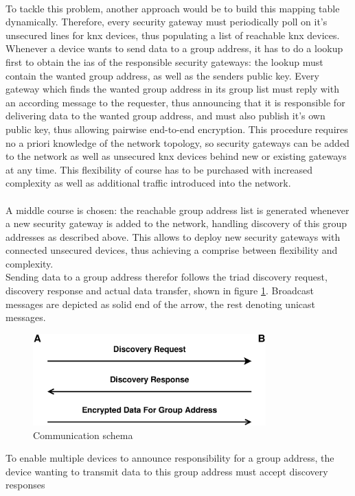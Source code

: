 \\
To tackle this problem, another approach would be to build this mapping table dynamically. Therefore, every security gateway must periodically poll
on it's unsecured lines for \gls{knx} devices, thus populating a list of reachable \gls{knx} devices. Whenever a 
device wants to send data to a group address, it has to do a lookup first to obtain the \glspl{ia} of the responsible security gateways: the lookup
must contain the wanted group address, as well as the senders public key.
Every 
gateway which finds the wanted group address in its group list must reply with an according message to the requester, thus announcing that it is responsible
for delivering data to the wanted group address, and must also publish it's own public key, thus allowing pairwise end-to-end encryption.
This procedure requires no a priori knowledge of
the network topology, so security gateways can be added to the network as well as unsecured \gls{knx} devices behind new or existing gateways at any time. This
flexibility of course has to be purchased with increased complexity as well as additional traffic introduced into the network.
\\
\\
A middle course is chosen: the reachable group address list is generated whenever a new security gateway is added to the network,
 handling discovery of this group addresses as described
above. This allows to deploy new security gateways with connected unsecured devices, thus achieving a comprise between flexibility and complexity. 
\\
Sending data to a group address therefor follows the triad discovery request, discovery response and actual data transfer, shown in figure \ref{fig:prot1}. Broadcast
messages are depicted as solid end of the arrow, the rest denoting unicast messages.
\begin{figure}
  \centering
    \includegraphics[width=0.8\textwidth]{figures/protokoll1.eps}
 \caption{Communication schema}
 \label{fig:prot1}
\end{figure}
To enable multiple devices to announce responsibility for a group address, the device wanting to transmit data to this group address must accept discovery responses
